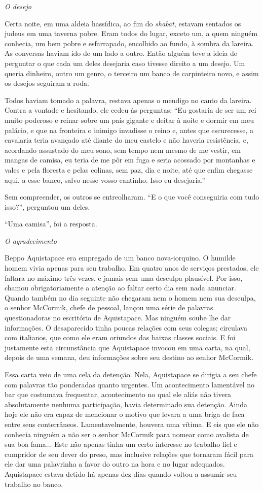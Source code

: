 \emph{O desejo }

Certa noite, em uma aldeia hassídica, ao fim do \emph{shabat}, estavam
sentados os judeus em uma taverna pobre. Eram todos do lugar, exceto um,
a quem ninguém conhecia, um bem pobre e esfarrapado, encolhido ao fundo,
à sombra da lareira. As conversas haviam ido de um lado a outro. Então
alguém teve a ideia de perguntar o que cada um deles desejaria caso
tivesse direito a um desejo. Um queria dinheiro, outro um genro, o
terceiro um banco de carpinteiro novo, e assim os desejos seguiram a
roda.

Todos haviam tomado a palavra, restava apenas o mendigo no canto da
lareira. Contra a vontade e hesitando, ele cedeu às perguntas: ``Eu
gostaria de ser um rei muito poderoso e reinar sobre um país gigante e
deitar à noite e dormir em meu palácio, e que na fronteira o inimigo
invadisse o reino e, antes que escurecesse, a cavalaria teria avançado
até diante do meu castelo e não haveria resistência, e, acordando
assustado do meu sono, sem tempo nem mesmo de me vestir, em mangas de
camisa, eu teria de me pôr em fuga e seria acossado por montanhas e
vales e pela floresta e pelas colinas, sem paz, dia e noite, até que
enfim chegasse aqui, a esse banco, salvo nesse vosso cantinho. Isso eu
desejaria.''

Sem compreender, os outros se entreolharam. ``E o que você conseguiria
com tudo isso?'', perguntou um deles.

``Uma camisa'', foi a resposta.

\emph{O agradecimento}

Beppo Aquistapace era empregado de um banco nova-iorquino. O humilde
homem vivia apenas para seu trabalho. Em quatro anos de serviços
prestados, ele faltara no máximo três vezes, e jamais sem uma desculpa
plausível. Por isso, chamou obrigatoriamente a atenção ao faltar certo
dia sem nada anunciar. Quando também no dia seguinte não chegaram nem o
homem nem sua desculpa, o senhor McCormik, chefe de pessoal, lançou uma
série de palavras questionadoras no escritório de Aquistapace. Mas
ninguém soube lhe dar informações. O desaparecido tinha poucas relações
com seus colegas; circulava com italianos, que como ele eram oriundos
das baixas classes sociais. E foi justamente esta circunstância que
Aquistapace invocou em uma carta, na qual, depois de uma semana, deu
informações sobre seu destino ao senhor McCormik.

Essa carta veio de uma cela da detenção. Nela, Aquistapace se dirigia a
seu chefe com palavras tão ponderadas quanto urgentes. Um acontecimento
lamentável no bar que costumava frequentar, acontecimento no qual ele
aliás não tivera absolutamente nenhuma participação, havia determinado
sua detenção. Ainda hoje ele não era capaz de mencionar o motivo que
levara a uma briga de faca entre seus conterrâneos. Lamentavelmente,
houvera uma vítima. E eis que ele não conhecia ninguém a não ser o
senhor McCormik para nomear como avalista de sua boa fama... Este não
apenas tinha um certo interesse no trabalho fiel e cumpridor de seu
dever do preso, mas inclusive relações que tornaram fácil para ele dar
uma palavrinha a favor do outro na hora e no lugar adequados.
Aquistapace estava detido há apenas dez dias quando voltou a assumir seu
trabalho no banco.


